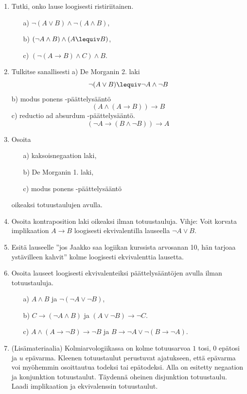 \begin{enumerate}
\item Tutki, onko lause loogisesti ristiriitainen.
\begin{itemize}
\item[a)] $\lnot (A \lor B) \land \lnot (A\land B)$,
\item[b)] $(\lnot A \land B) \land (A \lequiv B)$,
\item[c)] $(\lnot (A \to B) \land C) \land B$.
\end{itemize}

\item Tulkitse sanallisesti a)
De Morganin 2. laki
\[
\lnot (A\lor B) \lequiv \lnot A\land \lnot B
\]
b)
modus ponens -päättelysääntö
\[
(A \land (A\to B))\to B
\]
c)
reductio ad absurdum -päättelysääntö.
\[
(\lnot A \to (B\land \lnot B))\to A
\]

\item Osoita
\begin{itemize}
\item[a)] kaksoisnegaation laki,
\item[b)] De Morganin 1. laki,
\item[c)] modus ponens -päättelysääntö
\end{itemize}
oikeaksi totuustaulujen avulla.

\item Osoita kontraposition laki oikeaksi ilman
totuustauluja.
Vihje: Voit korvata implikaation $A\to B$ loogisesti
ekvivalentilla lauseella $\lnot A \lor B$.

\item Esitä lauseelle ''jos Jaakko saa logiikan kurssista
arvosanan 10, hän tarjoaa ystävilleen kahvit'' kolme
loogisesti ekvivalenttia lausetta.

\item Osoita lauseet loogisesti ekvivalenteiksi
päättelysääntöjen avulla ilman totuustauluja.
\begin{itemize}
\item[a)] $A\land B$ ja $\lnot(\lnot A \lor \lnot B)$,
\item[b)] $C\to (\lnot A \land B)$ ja $(A\lor \lnot B)\to
\lnot C$.
\item[c)] $A \land (A\to \lnot B)\to \lnot B$ ja $B\to
\lnot A\lor \lnot (B\to \lnot A)$.
\end{itemize}

\item (Lisämateriaalia) Kolmiarvologiikassa on kolme totuusarvoa $1$
tosi, $0$ epätosi ja $u$ epävarma. Kleenen totuustaulut
perustuvat ajatukseen, että epävarma voi myöhemmin
osoittautua todeksi tai epätodeksi. Alla on esitetty
negaation ja konjunktion totuustaulut. Täydennä
oheinen disjunktion totuustaulu. Laadi implikaation ja
ekvivalenssin totuustaulut.


\end{enumerate}
